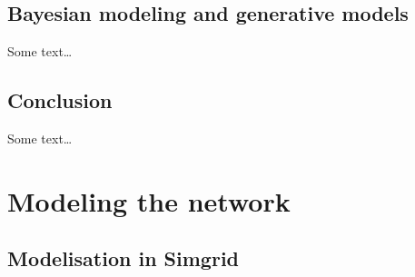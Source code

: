         \subsection{Bayesian modeling and generative models}%

            Some text\dots

        \subsection{Conclusion}%
            Some text\dots

    \section{Modeling the network}
    \label{sec:network_model}

        \subsection{Modelisation in Simgrid}%


